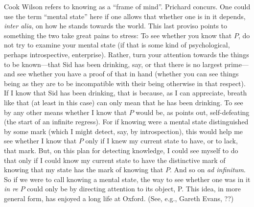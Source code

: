 Cook Wilson refers to knowing as a ``frame of mind''. Prichard concurs. One could use the term ``mental state'' here if one allows that whether one is in it depends, \emph{inter alia}, on how he stands towards the world. This last proviso points to something the two take great pains to stress: To see whether you know that \( P \), do not try to examine your mental state (if that is some kind of psychological, perhaps introspective, enterprise). Rather, turn your attention towards the things to be known---that Sid has been drinking, say, or that there is no largest prime---and see whether you have a proof of that in hand (whether you can see things being as they are to be incompatible with their being otherwise in that respect). If I know that Sid has been drinking, that is because, as I can appreciate, breath like that (at least in this case) can only mean that he has been drinking. To see by any other means whether I know that \( P \) would be, as \citet[92--93]{Prichard:1950tg} points out, self-defeating (the start of an infinite regress). For if knowing were a mental state distinguished by some mark (which I might detect, say, by introspection), this would help me see whether I know that \( P \) only if I knew my current state to have, or to lack, that mark. But, on this plan for detecting knowledge, I could see myself to do that only if I could know my current state to have the distinctive mark of knowing that my state has the mark of knowing that \( P \). And so on \emph{ad infinitum}. So if we were to call knowing a mental state, the way to see whether one was in it \emph{in re} \( P \) could only be by directing attention to its object, P. This idea, in more general form, has enjoyed a long life at Oxford. (See, e.g., Gareth Evans, ??)

